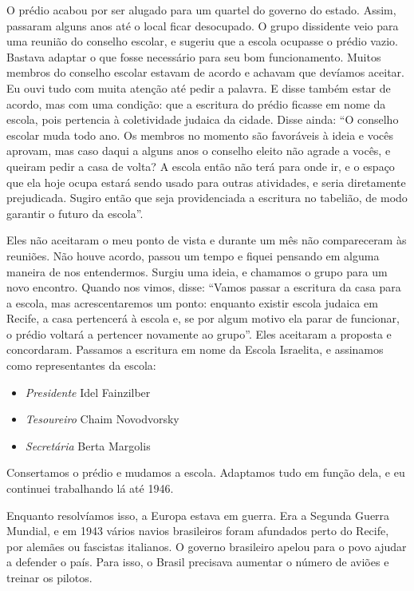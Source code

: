 O prédio acabou por ser alugado para um quartel do governo do estado. Assim, passaram
alguns anos até o local ficar desocupado. O grupo dissidente veio para
uma reunião do conselho escolar, e sugeriu que a escola 
ocupasse o prédio vazio. Bastava adaptar o que fosse necessário
para seu bom funcionamento. Muitos membros do conselho escolar
estavam de acordo e achavam que devíamos aceitar. Eu ouvi
tudo com muita atenção até pedir a palavra. E disse também estar de acordo, mas com uma condição: que a escritura do prédio ficasse em nome da escola, pois pertencia à 
coletividade judaica da cidade. Disse ainda: ``O conselho escolar muda todo ano. Os membros no momento são favoráveis à ideia e vocês aprovam, mas caso daqui a alguns anos o conselho eleito não agrade a vocês, e queiram pedir a casa de volta? A escola então não terá para onde ir, e o espaço que ela hoje ocupa estará sendo usado para outras atividades, e seria diretamente 
prejudicada. Sugiro então que seja providenciada a escritura no tabelião,
de modo garantir o futuro da escola''.

Eles não aceitaram o meu ponto de vista e durante um mês não
compareceram às reuniões. Não houve acordo, passou
um tempo e fiquei pensando em alguma maneira de nos entendermos.
Surgiu uma ideia, e chamamos o grupo para um novo encontro. Quando nos
vimos, disse: ``Vamos passar a escritura da casa
para a escola, mas acrescentaremos um ponto: enquanto existir escola
judaica em Recife, a casa pertencerá à escola e, se por algum motivo
ela parar de funcionar, o prédio voltará a pertencer novamente ao
grupo''. Eles aceitaram a proposta e concordaram. Passamos a escritura
em nome da Escola Israelita, e assinamos como representantes da escola:

\begin{itemize}
\item \textit{Presidente} Idel Fainzilber
\item \textit{Tesoureiro} Chaim Novodvorsky
\item \textit{Secretária} Berta Margolis
\end{itemize}

Consertamos o prédio e mudamos a escola. Adaptamos tudo em função dela,
e eu continuei trabalhando lá até 1946.

Enquanto resolvíamos isso, a Europa estava em guerra. Era a Segunda Guerra Mundial, 
e em 1943 vários navios brasileiros foram
afundados perto do Recife, por alemães ou fascistas italianos. O governo
brasileiro apelou para o povo ajudar a defender o país. Para isso,
o Brasil precisava aumentar o número de aviões e treinar os pilotos.

